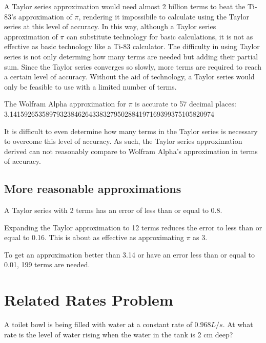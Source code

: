 \documentclass[12pt, titlepage]{article}
\begin{document}
A Taylor series approximation would need almost 2 billion terms to beat the Ti-83's approximation of \(\pi\), rendering it impossibile to calculate using the Taylor series at this level of accuracy. In this way, although a Taylor series approximation of \(\pi\) can substitute technology for basic calculations, it is not as effective as basic technology like a Ti-83 calculator. The difficulty in using Taylor series is not only determing how many terms are needed but adding their partial sum. Since the Taylor series converges so slowly, more terms are required to reach a certain level of accuracy. Without the aid of technology, a Taylor series would only be feasible to use with a limited number of terms.

The Wolfram Alpha approximation for \(\pi\) is accurate to 57 decimal places:
3.141592653589793238462643383279502884197169399375105820974

It is difficult to even determine how many terms in the Taylor series is necessary to overcome this level of accuracy. As such, the Taylor series approximation derived can not reasonably compare to Wolfram Alpha's approximation in terms of accuracy.

\subsection{More reasonable approximations}
A Taylor series with 2 terms has an error of less than or equal to 0.8.

Expanding the Taylor approximation to 12 terms reduces the error to less than or equal to 0.16. This is about as effective as approximating \(\pi\) as 3.

To get an approximation better than 3.14 or have an error less than or equal to 0.01, 199 terms are needed. 

\section{Related Rates Problem}
A toilet bowl is being filled with water at a constant rate of \(0.968 L/s\). At what rate is the level of water rising when the water in the tank is 2 cm deep?
\end{document}
